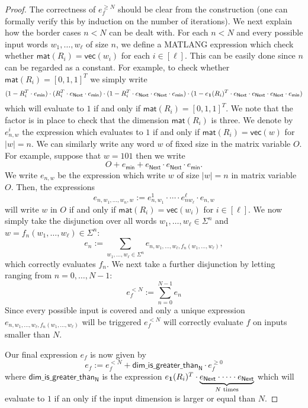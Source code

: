 \begin{proof}
The correctness of $e_f^{\geq N}$ should be clear from the construction (one can formally verify this by
induction on the number of iterations). We next explain how the border cases $n<N$ can be dealt with.
For each $n<N$ and every possible input words
$w_1,\ldots,w_\ell$ of size $n$, we define a MATLANG expression which check whether
$\mathsf{mat}(R_i)=\mathsf{vec}(w_i)$ for each $i\in[\ell]$. This can be easily done since $n$ 
can be regarded as a constant. For example, to check whether $\mathsf{mat}(R_i)=[0,1,1]^T$ we simply write
$$
(1- R_i^T\cdot e_{\mathsf{min}})\cdot (R_i^T\cdot e_{\mathsf{Next}}\cdot e_{\mathsf{min}})\cdot (1- R_i^T\cdot e_{\mathsf{Next}}\cdot e_{\mathsf{Next}}\cdot e_{\mathsf{min}})\cdot (1- e_{\mathbf{1}}(R_i)^T\cdot e_{\mathsf{Next}}\cdot e_{\mathsf{Next}}\cdot e_{\mathsf{Next}}\cdot e_{\mathsf{min}})
$$
which will evaluate to $1$ if and only if $\mathsf{mat}(R_i)=[0,1,1]^T$. We note that the factor is in 
place to check that the dimension $\mathsf{mat}(R_i)$ is three.
  We denote by
$e_{n,w}^i$ the expression which evaluates to $1$ if and only if $\mathsf{mat}(R_i)=\mathsf{vec}(w)$
for $|w|=n$.
We can similarly
write any word $w$ of fixed size in the matrix variable $O$. For example, suppose that $w=101$
then we write 
$$
O+ e_{\mathsf{min}}+  e_{\mathsf{Next}}\cdot e_{\mathsf{Next}}\cdot e_{\mathsf{min}}.
$$
We write $e_{n,w}$ be the expression which write $w$ of size $|w|=n$ in matrix variable $O$.
Then, the expressions
$$
e_{n,w_1,\ldots,w_n,w}:=e_{n,w_1}^1\cdot\cdots\cdot e_{nw_{\ell}}^\ell\cdot e_{n,w}
$$
will write $w$ in $O$ if and only if $\mathsf{mat}(R_i)=\mathsf{vec}(w_i)$ for $i\in[\ell]$.
We now simply take the disjunction over all words 
$w_1,\ldots,w_\ell\in\Sigma^n$ and $w=f_n(w_1,\ldots,w_\ell)\in\Sigma^n$:
$$
e_n:=\sum_{w_1,\ldots,w_\ell\in\Sigma^n} e_{n,w_1,\ldots,w_\ell,f_n(w_1,\ldots,w_\ell)},
$$
which correctly evaluates $f_n$. We next take a further disjunction by letting ranging from 
$n=0,\ldots, N-1$:
$$
e_f^{<N}:=\sum_{n=0}^{N-1} e_n
$$
Since every possible input is covered and only a unique expression 
$ e_{n,w_1,\ldots,w_\ell,f_n(w_1,\ldots,w_\ell)}$ will be triggered $e_f^{<N}$ will correctly
evaluate $f$ on inputs smaller than $N$.

Our final expression $e_f$ is now given by
$$
e_f:=e_f^{<N} + \mathsf{dim\_is\_greater\_than_N}\cdot e_f^{\geq 0}
$$
where $\mathsf{dim\_is\_greater\_than_N}$ is the expression
$e_{\mathbf{1}}(R_i)^T\cdot\underbrace{e_{\mathsf{Next}}\cdot\cdots\cdot e_{\mathsf{Next}}}_{\text{$N$ times}}$ 
which will evaluate to $1$ if an only if the input dimension is larger or equal than $N$.
\end{proof}

